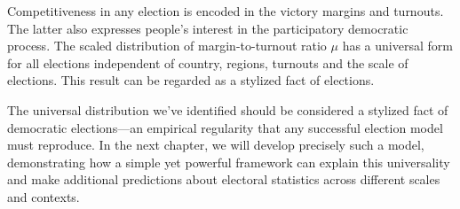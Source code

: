 Competitiveness in any election is encoded in the victory margins and turnouts. The latter also expresses people's interest in the participatory democratic process. The scaled distribution of margin-to-turnout ratio $\mu$ has a universal form for all elections independent of country, regions, turnouts and the scale of elections. This result can be regarded as a stylized fact of elections. 

The universal distribution we've identified should be considered a stylized fact of democratic elections—an empirical regularity that any successful election model must reproduce. In the next chapter, we will develop precisely such a model, demonstrating how a simple yet powerful framework can explain this universality and make additional predictions about electoral statistics across different scales and contexts.
